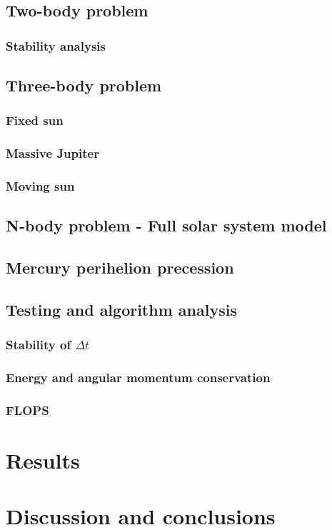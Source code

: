 \documentclass[10pt]{article}
\begin{document}
\begin{multicols}{2}
\subsection{Two-body problem} 
\subsubsection{Stability analysis}
\subsection{Three-body problem} 
\subsubsection{Fixed sun}
\subsubsection{Massive Jupiter}
\subsubsection{Moving sun}
\subsection{N-body problem - Full solar system model} 
\subsection{Mercury perihelion precession}
\subsection{Testing and algorithm analysis}
\subsubsection{Stability of $\Delta t$}
\subsubsection{Energy and angular momentum conservation}
\subsubsection{FLOPS}

\section{Results}

\section{Discussion and conclusions}
{}


\end{multicols}
\end{document}
